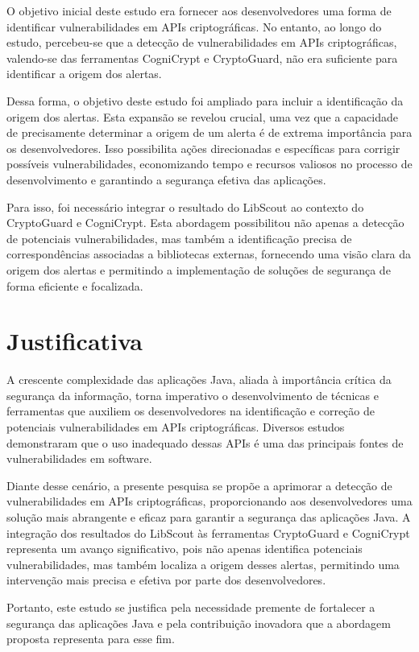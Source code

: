 O objetivo inicial deste estudo era fornecer aos desenvolvedores uma forma de identificar vulnerabilidades em APIs criptográficas. No entanto, ao longo do estudo, percebeu-se que a detecção de vulnerabilidades em APIs criptográficas, valendo-se das ferramentas CogniCrypt e CryptoGuard, não era suficiente para identificar a origem dos alertas.

Dessa forma, o objetivo deste estudo foi ampliado para incluir a identificação da origem dos alertas. Esta expansão se revelou crucial, uma vez que a capacidade de precisamente determinar a origem de um alerta é de extrema importância para os desenvolvedores. Isso possibilita ações direcionadas e específicas para corrigir possíveis vulnerabilidades, economizando tempo e recursos valiosos no processo de desenvolvimento e garantindo a segurança efetiva das aplicações.

Para isso, foi necessário integrar o resultado do LibScout ao contexto do CryptoGuard e CogniCrypt. Esta abordagem possibilitou não apenas a detecção de potenciais vulnerabilidades, mas também a identificação precisa de correspondências associadas a bibliotecas externas, fornecendo uma visão clara da origem dos alertas e permitindo a implementação de soluções de segurança de forma eficiente e focalizada.

\section{Justificativa}

A crescente complexidade das aplicações Java, aliada à importância crítica da segurança da informação, torna imperativo o desenvolvimento de técnicas e ferramentas que auxiliem os desenvolvedores na identificação e correção de potenciais vulnerabilidades em APIs criptográficas. Diversos estudos demonstraram que o uso inadequado dessas APIs é uma das principais fontes de vulnerabilidades em software. 

Diante desse cenário, a presente pesquisa se propõe a aprimorar a detecção de vulnerabilidades em APIs criptográficas, proporcionando aos desenvolvedores uma solução mais abrangente e eficaz para garantir a segurança das aplicações Java. A integração dos resultados do LibScout às ferramentas CryptoGuard e CogniCrypt representa um avanço significativo, pois não apenas identifica potenciais vulnerabilidades, mas também localiza a origem desses alertas, permitindo uma intervenção mais precisa e efetiva por parte dos desenvolvedores. 

Portanto, este estudo se justifica pela necessidade premente de fortalecer a segurança das aplicações Java e pela contribuição inovadora que a abordagem proposta representa para esse fim.

